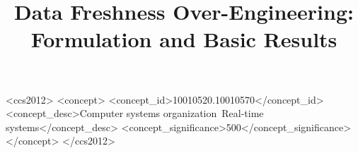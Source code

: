 \documentclass[sigconf]{acmart}
\begin{document}
	\title{Data Freshness Over-Engineering: Formulation and Basic Results}
	
	
	\iffalse
	\author{Dagaen Golomb}
	\orcid{0000-0002-1892-4098}
	\affiliation{%
		\institution{University of Pennsylvania}
		\city{Philadelphia} 
		\state{Pennsylvania} 
		\postcode{19104}
	}
	\email{dgolomb@seas.upenn.edu}
	
	\author{Deepak Gangadharan}
	\affiliation{%
		\institution{University of Pennsylvania}
		\city{Philadelphia} 
		\state{Pennsylvania} 
		\postcode{19104}
	}
	\email{deepakg@seas.upenn.edu}
	
	\author{Sanjian Chen}
	\affiliation{%
		\institution{University of Pennsylvania}
		\city{Philadelphia} 
		\state{Pennsylvania} 
		\postcode{19104}
	}
	\email{sanjian@seas.upenn.edu}
	
	\author{Oleg Sokolsky}
	\affiliation{%
		\institution{University of Pennsylvania}
		\city{Philadelphia} 
		\state{Pennsylvania} 
		\postcode{19104}
	}
	\email{sokolsky@cis.upenn.edu}
	
	\author{Insup Lee}
	\affiliation{%
		\institution{University of Pennsylvania}
		\city{Philadelphia} 
		\state{Pennsylvania} 
		\postcode{19104}
	}
	\email{lee@cis.upenn.edu}
	
	\renewcommand{\shortauthors}{D. Golomb et al.}
	\fi
	
	\begin{abstract}
		
	\end{abstract}

	
	\begin{CCSXML}
		<ccs2012>
		<concept>
		<concept_id>10010520.10010570</concept_id>
		<concept_desc>Computer systems organization~Real-time systems</concept_desc>
		<concept_significance>500</concept_significance>
		</concept>
		</ccs2012>
	\end{CCSXML}
	
\end{document}
